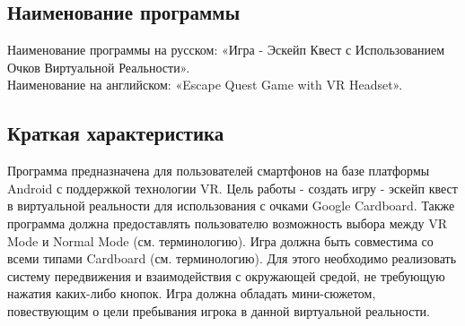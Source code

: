 \subsection{Наименование программы}
\tab[0.75cm]Наименование программы на русском: «Игра - Эскейп Квест с Использованием Очков Виртуальной Реальности». \\
Наименование на английском: «Escape Quest Game with VR Headset». \\


\subsection{Краткая характеристика}
\tab[0.75cm]
Программа предназначена для пользователей смартфонов на базе платформы Android с поддержкой технологии VR. Цель работы - создать игру - эскейп квест в виртуальной реальности для использования с очками Google Cardboard.
Также программа должна предоставлять пользователю возможность выбора между VR Mode и Normal Mode (см. терминологию). Игра должна быть совместима со всеми типами Cardboard (см. терминологию). Для этого необходимо реализовать систему передвижения и взаимодействия с окружающей средой, не требующую нажатия каких-либо кнопок. Игра должна обладать мини-сюжетом, повествующим о цели пребывания игрока в данной виртуальной реальности.